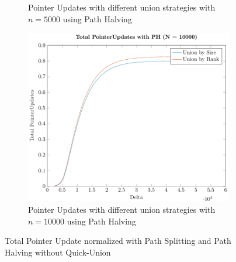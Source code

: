 \begin{figure}[ht]
\begin{subfigure}{0.32\textwidth}
        \caption{Pointer Updates with different union strategies with $n = 5000$ using Path Halving}
    \end{subfigure}%
    \hfill
    \begin{subfigure}{0.32\textwidth}
        \centering
        \includegraphics[width=\textwidth]{../images/plotPHNonFull10000_PointerUpdates.pdf}
        \caption{Pointer Updates with different union strategies with $n = 10000$ using Path Halving}
    \end{subfigure}

    \caption{Total Pointer Update normalized with Path Splitting and Path Halving without Quick-Union}
    \label{fig:tpuNH}
\end{figure}
